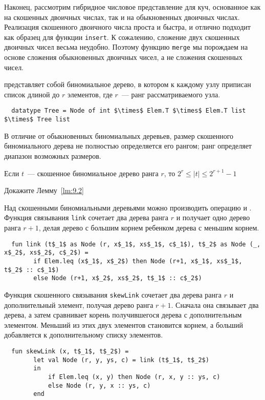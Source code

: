 Наконец, рассмотрим гибридное числовое представление для куч,
основанное как на скошенных двоичных числах, так и на обыкновенных
двоичных числах. Реализация скошенного двоичного числа проста и
быстра, и отлично подходит как образец для функции
\lstinline!insert!. К сожалению, сложение двух скошенных двоичных
чисел весьма неудобно. Поэтому функцию \lstinline!merge! мы порождаем
на основе сложения обыкновенных двоичных чисел, а не сложения
скошенных чисел.

 представляет
собой биномиальное дерево, в котором к каждому узлу приписан список
длиной до $r$ элементов, где $r$~--- ранг рассматриваемого узла.
\begin{lstlisting}
  datatype Tree = Node of int $\times$ Elem.T $\times$ Elem.T list $\times$ Tree list
\end{lstlisting}
В отличие от обыкновенных биномиальных деревьев, размер скошенного
биномиального дерева не полностью определяется его рангом; ранг
определяет диапазон возможных размеров.

\begin{lemma}
  \label{lm:9.2}
  Если $t$~--- скошенное биномиальное дерево ранга $r$, то $2^r \le
  |t| \le 2^{r+1} - 1$
  \begin{exercise}\label{ex:9.15}
    Докажите Лемму~\ref{lm:9.2}
  \end{exercise}
\end{lemma}

Над скошенными биномиальными деревьями можно производить операцию
 и .
Функция связывания \lstinline!link! сочетает два дерева ранга $r$ и
получает одно дерево ранга $r+1$, делая дерево с большим корнем
ребенком дерева с меньшим корнем.
\begin{lstlisting}
  fun link (t$_1$ as Node (r, x$_1$, xs$_1$, c$_1$), t$_2$ as Node (_, x$_2$, xs$_2$, c$_2$) =
        if Elem.leq (x$_1$, x$_2$) then Node (r+1, x$_1$, xs$_1$, t$_2$ :: c$_1$)
        else Node (r+1, x$_2$, xs$_2$, t$_1$ :: c$_2$)
\end{lstlisting}
Функция скошенного связывания \lstinline!skewLink! сочетает два дерева
ранга $r$ и дополнительный элемент, получая дерево ранга
$r+1$. Сначала она связывает два дерева, а затем сравнивает корень
получившегося дерева с дополнительным элементом. Меньший из этих двух
элементов становится корнем, а больший добавляется к дополнительному
списку элементов.
\begin{lstlisting}
  fun skewLink (x, t$_1$, t$_2$) =
        let val Node (r, y, ys, c) = link (t$_1$, t$_2$)
        in
            if Elem.leq (x, y) then Node (r, x, y :: ys, c)
            else Node (r, y, x :: ys, c)
        end
\end{lstlisting}

